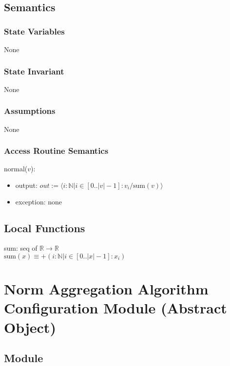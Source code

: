 \documentclass[12pt]{article}
\begin{document}
\subsection* {Semantics}

\subsubsection* {State Variables}

None

\subsubsection* {State Invariant}

None

\subsubsection* {Assumptions}

None

\subsubsection* {Access Routine Semantics}

\noindent normal($v$):
\begin{itemize}
\item output: $\mathit{out} := \langle i: \mathbb{N} | i \in [0 .. |v|-1] :
  v_i/\text{sum}(v) \rangle$
\item exception: none
\end{itemize}

\subsection*{Local Functions}

\noindent sum: seq of $\mathbb{R} \rightarrow \mathbb{R}$\\
\noindent $\mbox{sum}(x) \equiv + (i: \mathbb{N} | i \in [0 .. |x|-1] : x_i )$\\

\newpage

\section* {Norm Aggregation Algorithm Configuration Module (Abstract Object)}

\subsection*{Module}
\end{document}
